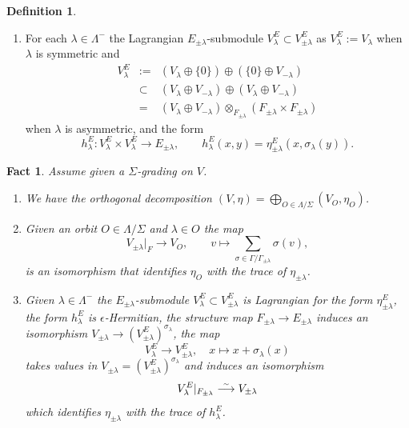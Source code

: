 \documentclass{article}
\def\simto{\buildrel\hbox{\tiny{$\sim$}}\over\longrightarrow}
\newtheorem{fct}[thm]{Fact}
\theoremstyle{definition}
\newtheorem{dfn}[thm]{Definition}
\numberwithin{equation}{subsection}
\renewcommand{\-}{\hyp{}}
\begin{document}
\begin{dfn}
\begin{enumerate}
\begin{enumerate}
		\item For each $\lambda \in \Lambda^-$ the Lagrangian $E_{\pm\lambda}$-submodule $V_\lambda^E \subset V_{\pm\lambda}^E$ as $V_\lambda^E:=V_\lambda$ when $\lambda$ is symmetric and 
		\begin{eqnarray*}
                        V_\lambda^E&:=&(V_\lambda \oplus \{0\}) \oplus (\{0\} \oplus V_{-\lambda}) \\
                        &\subset& (V_\lambda \oplus V_{-\lambda}) \oplus (V_\lambda \oplus V_{-\lambda})\\
                        &=&(V_\lambda \oplus V_{-\lambda}) \otimes_{F_{\pm\lambda}} (F_{\pm\lambda} \times F_{\pm\lambda})
        \end{eqnarray*}
when $\lambda$ is asymmetric, and the form
		\[ h_\lambda^E : V_\lambda^E \times V_\lambda^E \to E_{\pm\lambda},\qquad h_\lambda^E(x,y)=\eta_{\pm\lambda}^E(x,\sigma_\lambda(y)). \]
	\end{enumerate}
	\end{enumerate}
\end{dfn}

\begin{fct}  \label{fct:lambda_grading}
	Assume given a $\Sigma$-grading on $V$.
	\begin{enumerate}
		\item We have the orthogonal decomposition $(V,\eta)=\bigoplus_{O \in \Lambda/\Sigma} (V_O,\eta_O)$.
		\item Given an orbit $O \in \Lambda/\Sigma$ and $\lambda \in O$ the map
		\[ V_{\pm\lambda}|_F \to V_O,\qquad v \mapsto \sum_{\sigma \in \Gamma/\Gamma_{\pm\lambda}} \sigma(v), \]
		is an isomorphism that identifies $\eta_O$ with the trace of $\eta_{\pm\lambda}$. \item Given $\lambda \in \Lambda^-$ the $E_{\pm\lambda}$-submodule $V_\lambda^E \subset V_{\pm\lambda}^E$ is Lagrangian for the form $\eta_{\pm\lambda}^E$, the form $h_\lambda^E$ is $\epsilon$-Hermitian, the structure map $F_{\pm\lambda} \to E_{\pm\lambda}$ induces an isomorphism $V_{\pm\lambda} \to (V_{\pm\lambda}^E)^{\sigma_\lambda}$, the map
		\[  V_\lambda^E \to V_{\pm\lambda}^E,\quad x \mapsto x+\sigma_\lambda(x) \]
		takes values in $V_{\pm\lambda} = (V_{\pm\lambda}^E)^{\sigma_\lambda}$ and induces an isomorphism
		\[ V_\lambda^E|_{F_{\pm\lambda}} \simto V_{\pm\lambda} \]
		which identifies $\eta_{\pm\lambda}$ with the trace of $h_\lambda^E$.
	\end{enumerate}
\end{fct}
\end{document}
